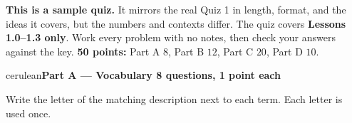 \documentclass[10pt]{article}
\newcommand{\parthead}[1]{%
  \vspace{6pt}\noindent
  {\tcbset{after={\par\nopagebreak}}%
   \begin{headlinebox}{cerulean}{\color{white}\bfseries #1}\end{headlinebox}}%
  \nopagebreak\vspace{4pt}}
\begin{document}

\vspace{0.10in}
\begin{remindbox}
\small
\textbf{This is a sample quiz.} It mirrors the real Quiz 1 in length, format, and the ideas it
covers, but the numbers and contexts differ. The quiz covers \textbf{Lessons 1.0--1.3 only}.
Work every problem with no notes, then check your answers against the key.
\textbf{50 points:} Part A $8$, Part B $12$, Part C $20$, Part D $10$.
\end{remindbox}

\parthead{Part A --- Vocabulary \hfill 8 questions, 1 point each}

\small
Write the letter of the matching description next to each term. Each letter is used once.
\end{document}
